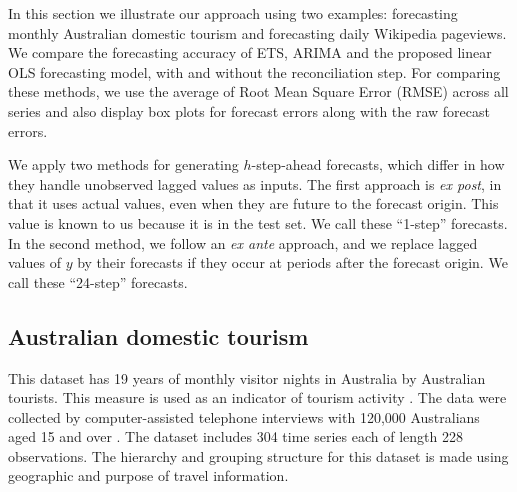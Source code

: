 \documentclass[11pt,a4paper,]{article}
\begin{document}
In this section we illustrate our approach using two examples: forecasting monthly Australian domestic tourism and forecasting daily Wikipedia pageviews. We compare the forecasting accuracy of ETS, ARIMA and the proposed linear OLS forecasting model, with and without the reconciliation step. For comparing these methods, we use the average of Root Mean Square Error (RMSE) across all series and also display box plots for forecast errors along with the raw forecast errors.

We apply two methods for generating \(h\)-step-ahead forecasts, which differ in how they handle unobserved lagged values as inputs. The first approach is \emph{ex post}, in that it uses actual values, even when they are future to the forecast origin. This value is known to us because it is in the test set. We call these ``1-step'' forecasts. In the second method, we follow an \emph{ex ante} approach, and we replace lagged values of \(y\) by their forecasts if they occur at periods after the forecast origin. We call these ``24-step'' forecasts.

\hypertarget{australian-domestic-tourism}{%
\subsection{Australian domestic tourism}\label{australian-domestic-tourism}}

This dataset has 19 years of monthly visitor nights in Australia by Australian tourists. This measure is used as an indicator of tourism activity \autocite{mint2018}. The data were collected by computer-assisted telephone interviews with 120,000 Australians aged 15 and over \autocite{researchAustralia2005}. The dataset includes 304 time series each of length 228 observations. The hierarchy and grouping structure for this dataset is made using geographic and purpose of travel information.

\newpage

\begingroup\fontsize{9}{11}\selectfont
\end{document}
